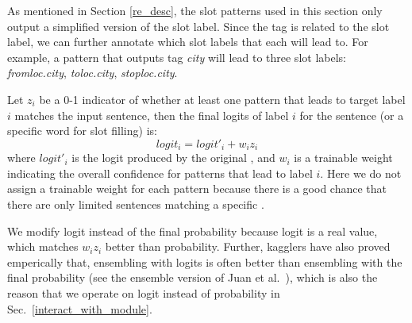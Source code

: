 As mentioned in Section \ref{re_desc}, the slot \RE patterns used in this section only output a simplified version of the slot label.
Since the \RE tag is related to the slot label, we can further annotate which slot labels that each \RE will lead to.
For example, a pattern that outputs tag \emph{city} will lead to three slot labels: \emph{fromloc.city}, \emph{toloc.city}, \emph{stoploc.city}.

Let $z_i$ be a 0-1 indicator of whether at least one \RE pattern that leads to target label $i$ matches the input sentence, then the final logits of label $i$ for the sentence (or a specific word for slot filling) is: 
\begin{equation}
logit_i = logit'_i + w_i z_i
\end{equation}
where $logit'_i$ is the logit produced by the original \NN, and $w_i$ is a trainable weight indicating the overall confidence for patterns that lead to label $i$.
Here we do not assign a trainable weight for each pattern because there is a good chance that there are only limited sentences matching a specific \RE.

We modify logit instead of the final probability because logit is a real value, which matches $w_i z_i$ better than probability. Further, kagglers have also proved emperically that, ensembling with logits is often better than ensembling with the final probability (see the ensemble version of Juan et al.~), which is also the reason that we operate on logit instead of probability in Sec.~\ref{interact_with_module}.


